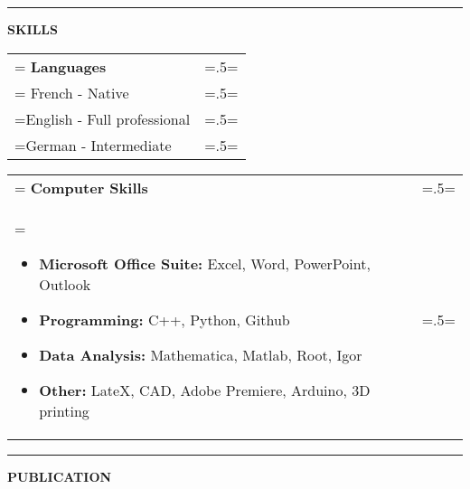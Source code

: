 \documentclass[letterpaper, 11pt]{article}
\begin{document}
\begin{center}
\noindent\rule{0.75\textwidth}{1pt}
\end{center}

\begin{center}
\large\bf{SKILLS}
\end{center}

\begin{tabularx}{1.0\textwidth} { 
   >{\raggedright\arraybackslash\hsize=1.5\hsize\linewidth=\hsize}X 
   >{\raggedleft\arraybackslash\hsize=.5\hsize\linewidth=\hsize}X }
\normalsize
\bf{Languages} & \\
\normalfont
French - Native & \\
English - Full professional & \\
German - Intermediate 
\end{tabularx}
\vspace{0.25cm}

\begin{tabularx}{1.0\textwidth} { 
   >{\raggedright\arraybackslash\hsize=1.5\hsize\linewidth=\hsize}X 
   >{\raggedleft\arraybackslash\hsize=.5\hsize\linewidth=\hsize}X }
\normalsize
\bf{Computer Skills} & \\
\normalfont \begin{itemize}[leftmargin=*,noitemsep,topsep=0pt]
\item \textbf{Microsoft Office Suite:}  Excel, Word, PowerPoint, Outlook
\item \textbf{Programming:} C++, Python, Github
\item \textbf{Data Analysis:} Mathematica, Matlab, Root, Igor
\item \textbf{Other:} LateX, CAD, Adobe Premiere, Arduino, 3D printing
\end{itemize} & 
\end{tabularx}

\begin{center}
\noindent\rule{0.75\textwidth}{1pt}
\end{center}

\begin{center}
\large\bf{PUBLICATION}
\end{center}

\nocite{*}

\printbibliography[title=\normalsize Master Thesis]

\end{document}
